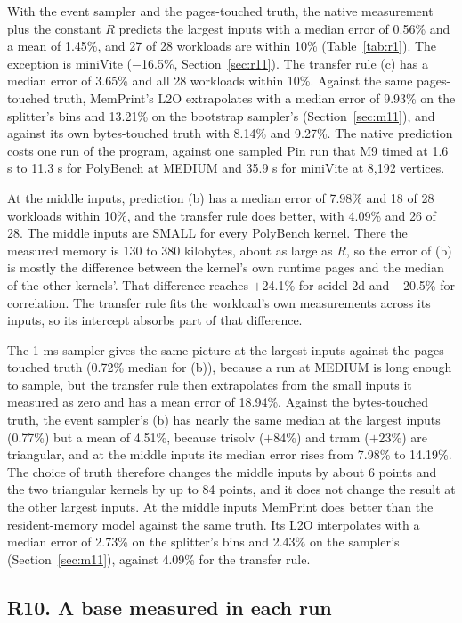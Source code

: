 \documentclass[11pt]{article}
\newcommand{\memprint}{MemPrint}
\begin{document}
With the event sampler and the pages-touched truth, the native measurement plus the constant $R$ predicts the
largest inputs with a median error of 0.56\% and a mean of 1.45\%, and 27 of 28 workloads are within 10\%
(Table~\ref{tab:r1}). The exception is miniVite ($-$16.5\%, Section~\ref{sec:r11}). The transfer rule (c) has a
median error of 3.65\% and all 28 workloads within 10\%. Against the same pages-touched truth, \memprint{}'s L2O
extrapolates with a median error of 9.93\% on the splitter's bins and 13.21\% on the bootstrap sampler's
(Section~\ref{sec:m11}), and against its own bytes-touched truth with 8.14\% and 9.27\%. The native
prediction costs one run of the program, against one sampled Pin run that M9 timed at 1.6 s to 11.3 s for PolyBench at
MEDIUM and 35.9 s for miniVite at 8,192 vertices.

At the middle inputs, prediction (b) has a median error of 7.98\% and 18 of 28 workloads within 10\%, and the
transfer rule does better, with 4.09\% and 26 of 28. The middle inputs are SMALL for every PolyBench kernel. There
the measured memory is 130 to 380 kilobytes, about as large as $R$, so the error of (b) is mostly the difference between
the kernel's own runtime pages and the median of the other kernels'. That difference reaches $+$24.1\% for
seidel-2d and $-$20.5\% for correlation. The transfer rule fits the workload's own measurements across its inputs,
so its intercept absorbs part of that difference.

The 1 ms sampler gives the same picture at the largest inputs against the pages-touched truth (0.72\% median for
(b)), because a run at MEDIUM is long enough to sample, but the transfer rule then extrapolates from the small
inputs it measured as zero and has a mean error of 18.94\%. Against the bytes-touched truth, the event sampler's
(b) has nearly the same median at the largest inputs (0.77\%) but a mean of 4.51\%, because trisolv ($+$84\%) and
trmm ($+$23\%) are triangular, and at the middle inputs its median error rises from 7.98\% to 14.19\%. The choice
of truth therefore changes the middle inputs by about 6 points and the two triangular kernels by up to 84 points,
and it does not change the result at the other largest inputs. At the middle inputs \memprint{} does better than
the resident-memory model against the same truth. Its L2O interpolates with a median error of 2.73\% on the
splitter's bins and 2.43\% on the sampler's (Section~\ref{sec:m11}), against 4.09\% for the transfer rule.

\subsection{R10. A base measured in each run}
\label{sec:r10}
\end{document}
